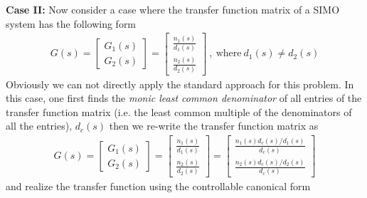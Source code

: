 \documentclass[twoside]{article}
\begin{document}
\textbf{Case II:} Now consider a case where the transfer function matrix of a SIMO system has the following form
%
\begin{align*}
	G(s) = \left[ \begin{array}{c} G_1(s) \\ G_2(s) \end{array} \right] = \left[ \begin{array}{c} \frac{n_1(s)}{d_1(s)} \\ \frac{n_2(s)}{d_2(s)} \end{array} \right]	      
	\ , \ \mathrm{where} \ d_1(s) \neq d_2(s)
\end{align*}
% 
Obviously we can not directly apply the standard approach for this problem. In this case, one first finds
the \textit{monic least common denominator} of all entries of the transfer function matrix (i.e. the least common multiple of the
denominators of all the entries), $d_c(s)$ then we re-write the transfer function matrix as
%
\begin{align*}
	G(s) = \left[ \begin{array}{c} G_1(s) \\ G_2(s) \end{array} \right] = \left[ \begin{array}{c} \frac{n_1(s)}{d_1(s)} \\ \frac{n_2(s)}{d_2(s)} \end{array} \right]	      
	= \left[ \begin{array}{c} \frac{n_1(s) d_c(s) / d_1(s) }{d_c(s)} \\ \frac{n_2(s) d_c(s) / d_2(s)}{d_c(s)} \end{array} \right]	      
\end{align*}
% 
and realize the transfer function using the controllable canonical form
 
\end{document}
